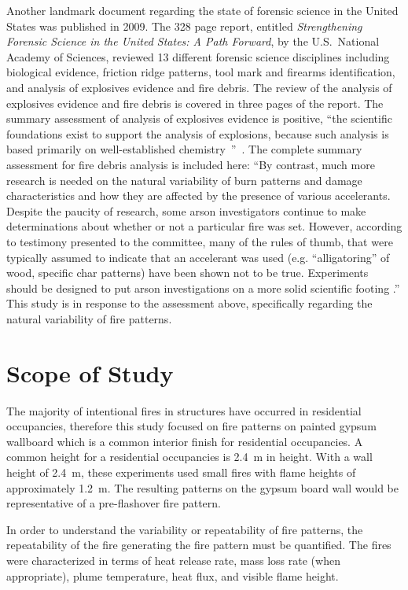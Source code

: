 \documentclass[twoside]{uocthesis}
\begin{document}
Another landmark document regarding the state of forensic science in the United States was published in 2009.  The 328 page report, entitled {\em Strengthening Forensic Science in the United States: A Path Forward}, by the U.S.~National Academy of Sciences, reviewed 13 different forensic science disciplines including biological evidence, friction ridge patterns, tool mark and firearms identification, and analysis of explosives evidence and fire debris.  The review of the analysis of explosives evidence and fire debris is covered in three pages of the report.  The summary assessment of analysis of explosives evidence is positive, ``the scientific foundations exist to support the analysis of explosions, because such analysis is based primarily on well-established chemistry~''~\cite{Forensic:2009}.  The complete summary assessment for fire debris analysis is included here: ``By contrast, much more research is needed on the natural variability of burn patterns and damage characteristics and how they are affected by the presence of various accelerants.  Despite the paucity of research, some arson investigators continue to make determinations about whether or not a particular fire was set.  However, according to testimony presented to the committee, many of the rules of thumb, that were typically assumed to indicate that an accelerant was used (e.g. ``alligatoring'' of wood, specific char patterns) have been shown not to be true.  Experiments should be designed to put arson investigations on a more solid scientific footing .''
This study is in response to the assessment above, specifically regarding the natural variability of fire patterns.


\section{Scope of Study}

The majority of intentional fires in structures have occurred in residential occupancies, therefore this study focused on fire patterns on painted gypsum wallboard which is a common interior finish for residential occupancies.  A common height for a residential occupancies is 2.4~m in height.  With a wall height of 2.4~m, these experiments used small fires with flame heights of approximately 1.2~m.  The resulting patterns on the gypsum board wall would be representative of a pre-flashover fire pattern.

In order to understand the variability or repeatability of fire patterns, the repeatability of the fire generating the fire pattern must be quantified.  The fires were characterized in terms of heat release rate, mass loss rate (when appropriate), plume temperature, heat flux, and visible flame height.
\end{document}
